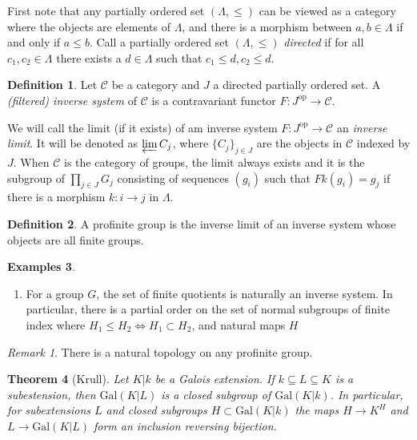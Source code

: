 \documentclass{article}
\newtheorem{theorem}{Theorem}[section]
\theoremstyle{definition}
\newtheorem{definition}[theorem]{Definition}
\newtheorem{examples}[theorem]{Examples}
\theoremstyle{remark}
\newtheorem*{remark}{Remark}
\newcommand{\mc}[1]{\mathcal{#1}}
\begin{document}
First note that any partially ordered set $(\Lambda, \leq)$ can be viewed as a category where the objects are elements of $\Lambda$, and there is a morphism between $a,b \in \Lambda$ if and only if $a \leq b$.
Call a partially ordered set $(\Lambda, \leq)$ \textit{directed} if for all $c_1, c_2 \in \Lambda$ there exists a $d \in \Lambda$ such that $c_1 \leq d, c_2 \leq d$.

\begin{definition}
	Let $\mc{C}$ be a category and $J$ a directed partially ordered set. A \textit{(filtered) inverse system} of $\mc{C}$ is a contravariant functor $F: J^{\text{op}} \to \mc{C}$.
\end{definition}

We will call the limit (if it exists) of am inverse system $F: J^{\text{op}} \to \mc{C}$ an \textit{inverse limit}.
It will be denoted as $\varprojlim C_{j}$, where $\{C_j\}_{j \in J}$ are the objects in $\mc{C}$ indexed by $J$.
When $\mc{C}$ is the category of groups, the limit always exists and it is the subgroup of $\prod_{j \in J} G_j$ consisting of sequences $(g_i)$ such that $Fk(g_i) = g_j$ if there is a morphism $k: i  \to j$ in $\Lambda$.

\begin{definition}
	A profinite group is the inverse limit of an inverse system whose objects are all finite groups.
\end{definition}

\begin{examples} \text{}
\begin{enumerate}
	\item For a group $G$, the set of finite quotients is naturally an inverse system.
		In particular, there is a partial order on the set of normal subgroups of finite index where $H_1 \leq H_2 \Longleftrightarrow H_1 \subset H_2$, and natural maps $H$
\end{enumerate}
\end{examples}

\begin{remark}
	There is a natural topology on any profinite group.
\end{remark}

\begin{theorem}[Krull]
	Let $K | k$ be a Galois extension.
	If $k \subseteq L \subseteq K$ is a subestension, then $\text{Gal}(K|L)$ is a closed subgroup of $\text{Gal}(K|k)$.
	In particular, for subextensions $L$ and closed subgroups $H \subset \text{Gal}(K|k)$ the maps $H \to K^H$ and $L \to \text{Gal}(K|L)$ form an inclusion reversing bijection.
\end{theorem}
\end{document}
